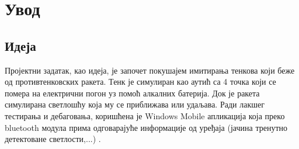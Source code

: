 
\chapter{Увод}
\section{Идеја}
Пројектни задатак, као идеја, је започет покушајем имитирања тенкова који беже од противтенковских ракета. Тенк је симулиран као аутић са 4 точка који се помера на електрични погон уз помоћ алкалних батерија. Док је ракета симулирана светлошћу која му се приближава или удаљава. Ради лакшег тестирања и дебаговања, коришћена је Windows Mobile апликација \cite{BluetoothTerminal} која преко bluetooth модула прима одговарајуће информације од уређаја (јачина тренутно детектоване светлости,...) . 

